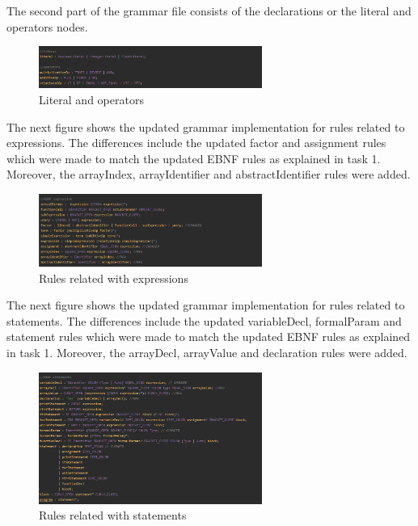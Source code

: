 \documentclass{article}
\begin{document}
						
			\noindent The second part of the grammar file consists of the declarations or the literal and operators nodes.
			
						\begin{figure}[H]
					\centering
			 			\includegraphics[width=0.65\textwidth]{antlrv1_2.png}
			  			\caption{Literal and operators}
			  			\label{fig:antlrv1_2}
					\end{figure}
					
					\noindent The next figure shows the updated grammar implementation for rules related to expressions. The differences include the updated factor and assignment rules which were made to match the updated EBNF rules as explained in task 1. Moreover, the arrayIndex, arrayIdentifier and abstractIdentifier rules were added.
			
						\begin{figure}[H]
					\centering
			 			\includegraphics[width=0.65\textwidth]{antlrv2_1.png}
			  			\caption{Rules related with expressions}
			  			\label{fig:antlrv2_1}
					\end{figure}
					
					\noindent The next figure shows the updated grammar implementation for rules related to statements. The differences include the updated variableDecl, formalParam and statement rules which were made to match the updated EBNF rules as explained in task 1. Moreover, the arrayDecl, arrayValue and declaration rules were added.
			
						\begin{figure}[H]
					\centering
			 			\includegraphics[width=0.65\textwidth]{antlrv2_2.png}
			  			\caption{Rules related with statements}
			  			\label{fig:antlrv2_2}
					\end{figure}
					
\end{document}
